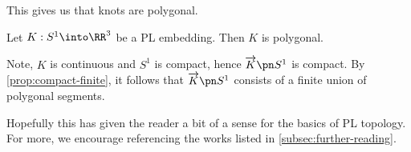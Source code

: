 This gives us that knots are polygonal.
\begin{corollary}
  Let $K : S^1 \into \RR^3$ be a PL embedding. Then $K$ is polygonal.
\end{corollary}
\begin{sproof}[Sketch]
  Note, $K$ is continuous and $S^1$ is compact, hence $\fim{K}{S^1}$
  is compact. By \cref{prop:compact-finite}, it follows that
  $\fim{K}{S^1}$ consists of a finite union of polygonal segments.
\end{sproof}
Hopefully this has given the reader a bit of a sense for the basics of
PL topology. For more, we encourage referencing the works listed in
\cref{subsec:further-reading}.









